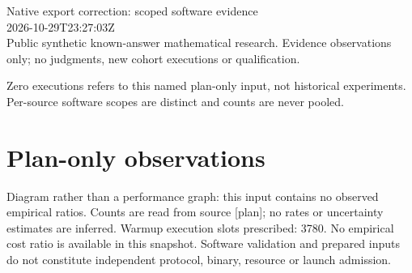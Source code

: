 \documentclass[11pt]{article}
\begin{document}
\raggedright\sloppy
{\LARGE Native export correction: scoped software evidence}\\[5pt]
2026-10-29T23:27:03Z\\
Public synthetic known-answer mathematical research. Evidence observations only; no judgments, new cohort executions or qualification.

Zero executions refers to this named plan-only input, not historical experiments. Per-source software scopes are distinct and counts are never pooled.
\section*{Plan-only observations}
\begin{center}\end{center}
Diagram rather than a performance graph: this input contains no observed empirical ratios. Counts are read from source [plan]; no rates or uncertainty estimates are inferred.
Warmup execution slots prescribed: 3780. No empirical cost ratio is available in this snapshot. Software validation and prepared inputs do not constitute independent protocol, binary, resource or launch admission.
\end{document}
